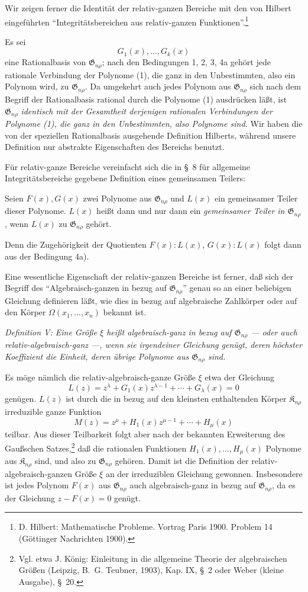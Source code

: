 \documentclass[11pt]{article}
\providecommand{\Kfield}{\mathfrak{K}}
\providecommand{\Gdom}{\mathfrak{G}}
\begin{document}
Wir zeigen ferner die Identität der relativ-ganzen Bereiche mit den von Hilbert eingeführten ``Integritätsbereichen aus relativ-ganzen Funktionen''.\footnote{D. Hilbert: Mathematische Probleme. Vortrag Paris 1900. Problem 14 (Göttinger Nachrichten 1900).}

Es sei
\begin{equation}
  G_1(x),\ldots,G_k(x)
\tag{1}
\end{equation}
eine Rationalbasis von $\Gdom_{n\rho}$; nach den Bedingungen 1, 2, 3, 4a gehört jede rationale Verbindung der Polynome (1), die ganz in den Unbestimmten, also ein Polynom wird, zu $\Gdom_{n\rho}$. Da umgekehrt auch jedes Polynom aus $\Gdom_{n\rho}$ sich nach dem Begriff der Rationalbasis rational durch die Polynome (1) ausdrücken läßt, ist $\Gdom_{n\rho}$ \emph{identisch mit der Gesamtheit derjenigen rationalen Verbindungen der Polynome (1), die ganz in den Unbestimmten, also Polynome sind.} Wir haben die von der speziellen Rationalbasis ausgehende Definition Hilberts, während unsere Definition nur abstrakte Eigenschaften des Bereichs benutzt.

Für relativ-ganze Bereiche vereinfacht sich die in \S\ 8 für allgemeine Integritätsbereiche gegebene Definition eines gemeinsamen Teilers:

Seien $F(x),G(x)$ zwei Polynome aus $\Gdom_{n\rho}$ und $L(x)$ ein gemeinsamer Teiler dieser Polynome. $L(x)$ heißt dann und nur dann ein \emph{gemeinsamer Teiler in $\Gdom_{n\rho}$}, wenn $L(x)$ zu $\Gdom_{n\rho}$ gehört.

Denn die Zugehörigkeit der Quotienten $F(x):L(x)$, $G(x):L(x)$ folgt dann aus der Bedingung 4a).

Eine wesentliche Eigenschaft der relativ-ganzen Bereiche ist ferner, daß sich der Begriff des ``Algebraisch-ganzen in bezug auf $\Gdom_{n\rho}$'' genau so an einer beliebigen Gleichung definieren läßt, wie dies in bezug auf algebraische Zahlkörper oder auf den Körper $\Omega(x_1,
\ldots,x_n)$ bekannt ist.

\emph{Definition V: Eine Größe $\xi$ heißt algebraisch-ganz in bezug auf $\Gdom_{n\rho}$ --- oder auch relativ-algebraisch-ganz ---, wenn sie irgendeiner Gleichung genügt, deren höchster Koeffizient die Einheit, deren übrige Polynome aus $\Gdom_{n\rho}$ sind.}

Es möge nämlich die relativ-algebraisch-ganze Größe $\xi$ etwa der Gleichung
\[
  L(z)=z^\lambda+G_1(x)z^{\lambda-1}+\cdots+G_\lambda(x)=0
\]
genügen. $L(z)$ ist durch die in bezug auf den kleinsten enthaltenden Körper $\Kfield_{n\rho}$ irreduzible ganze Funktion
\[
  M(z)=z^\mu+H_1(x)z^{\mu-1}+\cdots+H_\mu(x)
\]
teilbar. Aus dieser Teilbarkeit folgt aber nach der bekannten Erweiterung des Gaußschen Satzes,\footnote{Vgl. etwa J. König: Einleitung in die allgemeine Theorie der algebraischen Größen (Leipzig, B.~G. Teubner, 1903), Kap. IX, \S\ 2 oder Weber (kleine Ausgabe), \S\ 20.} daß die rationalen Funktionen $H_1(x),\ldots,H_\mu(x)$ Polynome aus $\Kfield_{n\rho}$ sind, und also zu $\Gdom_{n\rho}$ gehören. Damit ist die Definition der relativ-algebraisch-ganzen Größe $\xi$ an der irreduziblen Gleichung gewonnen. Insbesondere ist jedes Polynom $F(x)$ aus $\Gdom_{n\rho}$ auch algebraisch-ganz in bezug auf $\Gdom_{n\rho}$, da es der Gleichung $z-F(x)=0$ genügt.
\end{document}
